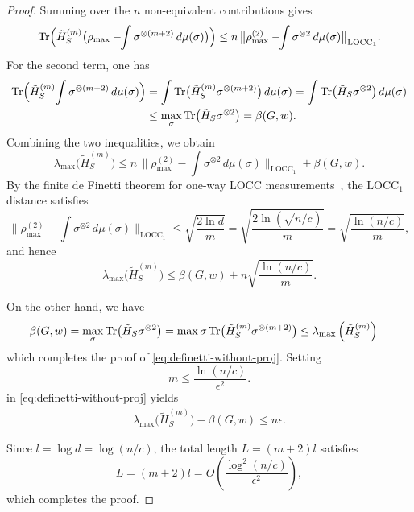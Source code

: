 \begin{proof}
Summing over the $n$ non-equivalent contributions gives
\begin{equation}
\operatorname{Tr}\Bigl(\tilde{H}_S^{(m)}\bigl(\rho_{\max}-\!\!\int \sigma^{\otimes (m+2)}\,d\mu(\sigma)\bigr)\Bigr)
\le n\,\bigl\lVert\rho^{(2)}_{\max}-\!\!\int \sigma^{\otimes 2}\,d\mu(\sigma)\bigr\rVert_{\mathrm{LOCC}_1}.
\end{equation}
For the second term, one has
\begin{align}
\operatorname{Tr}\Bigl(\tilde{H}_S^{(m)}\!\int \sigma^{\otimes (m+2)}\,d\mu(\sigma)\Bigr)
&= \int \operatorname{Tr}\bigl(\tilde{H}_S^{(m)}\sigma^{\otimes (m+2)}\bigr)\,d\mu(\sigma)
= \int \operatorname{Tr}\bigl(\tilde{H}_S\sigma^{\otimes 2}\bigr)\,d\mu(\sigma)\nonumber\\
&\leq \max_{\sigma} \operatorname{Tr}\bigl(\tilde{H}_S\sigma^{\otimes 2}\bigr)
=\beta(G,w).
\end{align}
Combining the two inequalities, we obtain
\begin{equation}
\lambda_{\max}\bigl(\tilde{H}_S^{(m)}\bigr)
\le n\,\bigl\lVert\rho^{(2)}_{\max}-\!\!\int \sigma^{\otimes 2}\,d\mu(\sigma)\bigr\rVert_{\mathrm{LOCC}_1}
+ \beta(G,w).
\end{equation}
By the finite de Finetti theorem for one-way LOCC measurements~\cite[Thm.~1]{li2015quantum}, the $\mathrm{LOCC}_1$ distance satisfies
\begin{equation}
\bigl\lVert\rho^{(2)}_{\max}-\!\!\int \sigma^{\otimes 2}\,d\mu(\sigma)\bigr\rVert_{\mathrm{LOCC}_1}
\le \sqrt{\frac{2\ln d}{m}}
= \sqrt{\frac{2\ln(\sqrt{n/c})}{m}}
= \sqrt{\frac{\ln(n/c)}{m}},
\end{equation}
and hence
\begin{equation}
\lambda_{\max}\bigl(\tilde{H}_S^{(m)}\bigr)
\le \beta(G,w) + n\sqrt{\frac{\ln(n/c)}{m}}.
\end{equation}

On the other hand, we have 
\begin{align}
   \beta(G,w) = \max_{\sigma} \operatorname{Tr}\bigl(\tilde{H}_S\sigma^{\otimes 2}\bigr)= \max{\sigma} \operatorname{Tr}\bigl(\tilde{H}_S^{(m)} \sigma^{\otimes (m+2) }\bigr)
&\leq \lambda_{\max} \left( \tilde{H}_S^{(m)} \right) 
\end{align}
which completes the proof of \eqref{eq:definetti-without-proj}.
Setting 
\begin{equation}
m \le \frac{\ln(n/c)}{\epsilon^2}.
\end{equation}
in \eqref{eq:definetti-without-proj} yields 
\begin{align}
    \lambda_{\max}\bigl(\tilde{H}_S^{(m)}\bigr) - \beta(G,w) \leq n \epsilon.
\end{align}

Since $l = \log d = \log(n/c)$, the total length $L = (m+2)l$ satisfies
\begin{equation}
L = (m+2)l = O\!\left(\frac{\log^2(n/c)}{\epsilon^2}\right),
\end{equation}
which completes the proof.
\end{proof}

